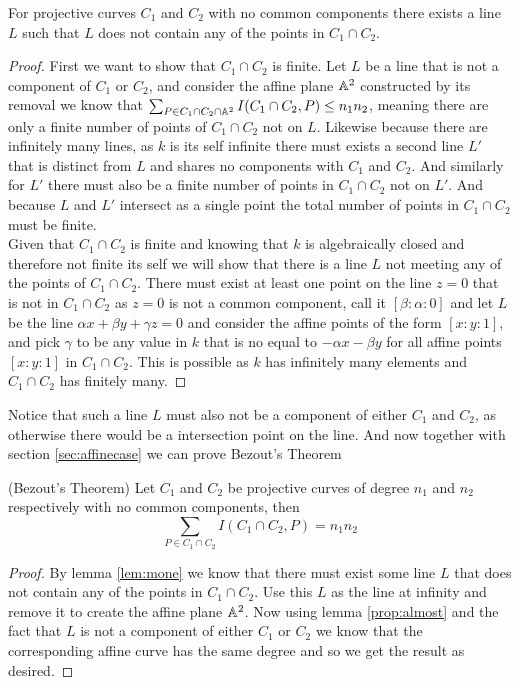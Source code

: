 \begin{lemma}
\label{lem:mone}
    For projective curves $C_1$ and $C_2$ with no common components there exists a line $L$ such that $L$ does not contain any of the points in $C_1\cap C_2$.
\end{lemma}
\begin{proof}
    First we want to show that $C_1\cap C_2$ is finite. Let $L$ be a line that is not a component of $C_1$ or $C_2$, and consider the affine plane $\mathbb{A}^2$ constructed by its removal we know that $\sum_{P\in C_1\cap C_2\cap \mathbb{A}^2}I(C_1\cap C_2, P)\leq n_1n_2$, meaning there are only a finite number of points of $C_1\cap C_2$ not on $L$. Likewise because there are infinitely many lines, as $k$ is its self infinite there must exists a second line $L'$ that is distinct from $L$ and shares no components with $C_1$ and $C_2$. And similarly for $L'$ there must also be a finite number of points in $C_1\cap C_2$ not on $L'$. And because $L$ and $L'$ intersect as a single point the total number of points in $C_1\cap C_2$ must be finite.\\

    Given that $C_1\cap C_2$ is finite and knowing that $k$ is algebraically closed and therefore not finite its self we will show that there is a line $L$ not meeting any of the points of $C_1\cap C_2$. There must exist at least one point on the line $z=0$ that is not in $C_1\cap C_2$ as $z=0$ is not a common component, call it $[\beta:\alpha:0]$ and let $L$ be the line $\alpha x+\beta y +\gamma z=0$ and consider the affine points of the form $[x:y:1]$, and pick $\gamma$ to be any value in $k$ that is no equal to $-\alpha x-\beta y$ for all affine points $[x:y:1]$ in $C_1\cap C_2$. This is possible as $k$ has infinitely many elements and $C_1\cap C_2$ has finitely many.
\end{proof}
Notice that such a line $L$ must also not be a component of either $C_1$ and $C_2$, as otherwise there would be a intersection point on the line. And now together with section \ref{sec:affinecase} we can prove Bezout's Theorem
\begin{thm}(Bezout's Theorem)
Let $C_1$ and $C_2$ be projective curves of degree $n_1$ and $n_2$ respectively with no common components, then 
$$\sum_{P\in C_1\cap C_2} I(C_1\cap C_2, P)=n_1n_2$$ %
\end{thm}
\begin{proof}
    By lemma \ref{lem:mone} we know that there must exist some line $L$ that does not contain any of the points in $C_1\cap C_2$. Use this $L$ as the line at infinity and remove it to create the affine plane $\mathbb{A}^2$. Now using lemma \ref{prop:almost} and the fact that $L$ is not a component of either $C_1$ or $C_2$ we know that the corresponding affine curve has the same degree and so we get the result as desired.
\end{proof}